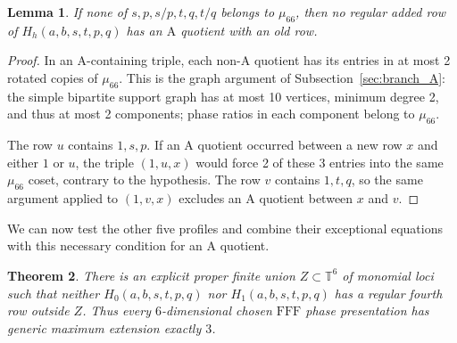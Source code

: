 \documentclass[11pt,a4paper]{article}
\newtheorem{theorem}{Theorem}[section]
\newtheorem{lemma}[theorem]{Lemma}
\theoremstyle{plain}
\theoremstyle{definition}
\theoremstyle{plain}
\begin{document}
\par\addvspace{\medskipamount}\noindent
\begin{minipage}{\linewidth}
\begin{lemma}\label{fff_generic:noA}
If none of $s,p,s/p,t,q,t/q$ belongs to $\mu_{66}$, then no regular added row of $H_h(a,b,s,t,p,q)$ has an $\mathrm{A}$ quotient with an old row.
\end{lemma}
\end{minipage}
\par\addvspace{\medskipamount}

\begin{proof}
In an $\mathrm{A}$-containing triple, each non-$\mathrm{A}$ quotient has its entries in at most 2 rotated copies of $\mu_{66}$. This is the graph argument of Subsection~\ref{sec:branch_A}: the simple bipartite support graph has at most 10 vertices, minimum degree 2, and thus at most 2 components; phase ratios in each component belong to $\mu_{66}$.

The row $u$ contains $1,s,p$. If an $\mathrm{A}$ quotient occurred between a new row $x$ and either $1$ or $u$, the triple $(1,u,x)$ would force 2 of these 3 entries into the same $\mu_{66}$ coset, contrary to the hypothesis. The row $v$ contains $1,t,q$, so the same argument applied to $(1,v,x)$ excludes an $\mathrm{A}$ quotient between $x$ and $v$.
\end{proof}

We can now test the other five profiles and combine their exceptional equations with this necessary condition for an $\mathrm{A}$ quotient.

\par\addvspace{\medskipamount}\noindent
\begin{minipage}{\linewidth}
\begin{theorem}\label{fff_generic:extension}
There is an explicit proper finite union $Z\subset\mathbb T^6$ of monomial loci such that neither $H_0(a,b,s,t,p,q)$ nor $H_1(a,b,s,t,p,q)$ has a regular fourth row outside $Z$. Thus every $6$-dimensional chosen $\mathrm{FFF}$ phase presentation has generic maximum extension exactly $3$.
\end{theorem}
\end{minipage}
\par\addvspace{\medskipamount}
\end{document}
